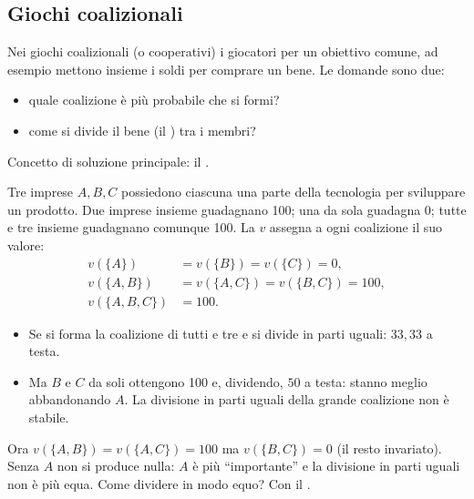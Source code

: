 \subsection{Giochi coalizionali}

Nei giochi coalizionali (o cooperativi) i giocatori  per un obiettivo
comune, ad esempio mettono insieme i soldi per comprare un bene.
Le domande sono due:
\begin{itemize}
  \item quale coalizione è più probabile che si formi?
  \item come si divide il bene (il ) tra i membri?
\end{itemize}
Concetto di soluzione principale: il .

\begin{esempio}
Tre imprese $A, B, C$ possiedono ciascuna una parte della tecnologia per sviluppare un prodotto.
Due imprese insieme guadagnano 100; una da sola guadagna 0; tutte e tre insieme guadagnano
comunque 100. La  $v$ assegna a ogni coalizione il suo valore:
\begin{align*}
  v(\{A\}) &= v(\{B\}) = v(\{C\}) = 0,\\
  v(\{A,B\}) &= v(\{A,C\}) = v(\{B,C\}) = 100,\\
  v(\{A,B,C\}) &= 100.
\end{align*}
\begin{itemize}
  \item Se si forma la coalizione di tutti e tre e si divide in parti uguali: $33{,}33$ a testa.
  \item Ma $B$ e $C$ da soli ottengono 100 e, dividendo, $50$ a testa: stanno meglio
        abbandonando $A$. La divisione in parti uguali della grande coalizione non è stabile.
\end{itemize}
\end{esempio}

\begin{esempio}
Ora $v(\{A,B\}) = v(\{A,C\}) = 100$ ma $v(\{B,C\}) = 0$ (il resto invariato).
Senza $A$ non si produce nulla: $A$ è più ``importante'' e la divisione in parti uguali
non è più equa. Come dividere in modo equo? Con il .
\end{esempio}

